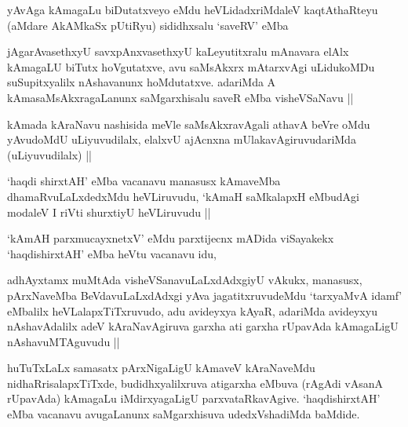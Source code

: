 
\begin{artha}
yAvAga kAmagaLu biDutatxveyo eMdu heVLidadxriMdaleV kaqtAthaRteyu
(aMdare AkAMkaSx pUtiRyu) sididhxsalu `saveRV' eMba
\end{artha}


\begin{artha}
jAgarAvasethxyU savxpAnxvasethxyU kaLeyutitxralu mAnavara elAlx
kAmagaLU biTutx hoVgutatxve, avu saMsAkxrx mAtarxvAgi uLidukoMDu
suSupitxyalilx nAshavanunx hoMdutatxve. adariMda A
kAmasaMsAkxragaLanunx saMgarxhisalu saveR eMba visheVSaNavu ||
\end{artha}


\begin{artha}
kAmada kAraNavu nashisida meVle saMsAkxravAgali athavA beVre oMdu
yAvudoMdU uLiyuvudilalx, elalxvU ajAcnxna mUlakavAgiruvudariMda
(uLiyuvudilalx) ||
\end{artha}


\begin{artha}
`haqdi shirxtAH' eMba vacanavu manasusx kAmaveMba dhamaRvuLaLxdedxMdu
  heVLiruvudu, `kAmaH saMkalapxH eMbudAgi modaleV I riVti shurxtiyU
  heVLiruvudu ||
\end{artha}

\begin{artha}
`kAmAH parxmucayxnetxV' eMdu parxtijecnx mADida viSayakekx
  `haqdishirxtAH' eMba heVtu vacanavu idu, 
\end{artha}

\begin{artha}
adhAyxtamx muMtAda visheVSanavuLaLxdAdxgiyU vAkukx, manasusx,
pArxNaveMba BeVdavuLaLxdAdxgi yAva jagatitxruvudeMdu `tarxyaMvA idamf'
eMbalilx heVLalapxTiTxruvudo, adu avideyxya kAyaR, adariMda avideyxyu
nAshavAdalilx adeV kAraNavAgiruva garxha ati garxha rUpavAda
kAmagaLigU nAshavuMTAguvudu ||
\end{artha}

\begin{artha}
huTuTxLaLx samasatx pArxNigaLigU kAmaveV kAraNaveMdu
nidhaRrisalapxTiTxde, budidhxyalilxruva atigarxha eMbuva (rAgAdi
vAsanA rUpavAda) kAmagaLu iMdirxyagaLigU
parxvataRkavAgive. `haqdishirxtAH' eMba vacanavu avugaLanunx
saMgarxhisuva udedxVshadiMda baMdide. 
\end{artha}

